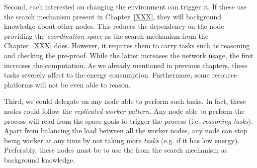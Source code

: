 Second, each \consumer{} interested on changing the environment can trigger it.
If these \consumers{} use the search mechanism present in Chapter~\ref{XXX}, they will background knowledge about other nodes.
This reduces the dependency on the node providing the \emph{coordination space} as the search mechanism from the Chapter~\ref{XXX} does.
However, it requires them to carry tasks such as reasoning and checking the pre-proof.
While the latter increases the network usage, the first increases the computation.
As we already mentioned in previous chapters, these tasks severely affect to the energy consumption.
Furthermore, some resource platforms will not be even able to reason.


Third, we could delegate on any node able to perform such tasks.
In fact, these nodes could follow the \emph{replicated-worker pattern}.
Any node able to perform the process will read from the space goals to trigger the process (i.e. \emph{reasoning tasks}).
Apart from balancing the load between all the worker nodes, any node can stop being worker at any time by not taking more \emph{tasks} (e.g. if it has low energy).
Preferably, these nodes must be \consumers{} to use the \clues{} from the search mechanism as background knowledge.






